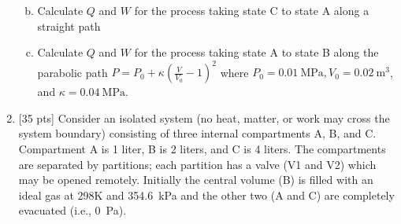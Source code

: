 \begin{enumerate}
\begin{enumerate}[(a)]

      \item Calculate $Q$ and $W$ for the process taking state C to
        state A along a straight path


      \item Calculate $Q$ and $W$ for the process taking state A to
        state B along the parabolic path $P = P_0 +
        \kappa\left(\frac{V}{V_0} - 1\right)^2$ where
        $P_0 = \SI{0.01}{\mega\pascal}, V_0 = \SI{0.02}{\meter\cubed}$, and
        $\kappa = \SI{0.04}{\mega\pascal}$.
    \end{enumerate}
  \item  {[35 pts]} Consider an isolated system (no heat, matter, or
    work may cross the system boundary)
    consisting of three internal compartments A, B, and C.
    Compartment A is 1 liter, B is 2 liters, and
    C is 4 liters. The compartments are separated by partitions; each
    partition has a valve (V1 and V2)
    which may be opened remotely. Initially the central volume (B) is
    filled with an ideal gas at 298K and
    \SI{354.6}{\kilo\pascal} and the other two (A and C) are
    completely evacuated (i.e., \SI{0}{\pascal}).


\end{enumerate}
